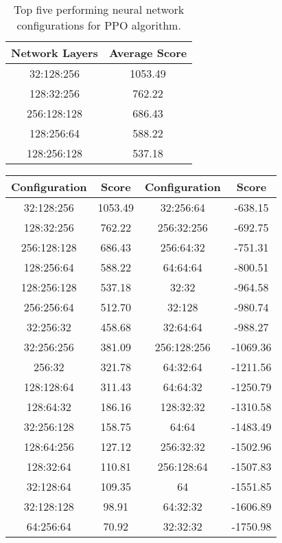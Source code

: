\begin{table}[h]
\centering
\begin{tabular}{|c|c|}
\hline
\textbf{Network Layers} & \textbf{Average Score} \\
\hline
\hline
32:128:256 & 1053.49 \\
\hline
128:32:256 & 762.22 \\
\hline
256:128:128 & 686.43 \\
\hline
128:256:64 & 588.22 \\
\hline
128:256:128 & 537.18 \\
\hline
\end{tabular}
\caption{Top five performing neural network configurations for PPO algorithm.}
\label{tab:ppo_top_nn_configurations}
\end{table}
    
\begin{table}[h]
\centering
\begin{tabular}{|c|c||c|c|}
\hline
Configuration & Score & Configuration & Score \\
\hline
32:128:256 & 1053.49 & 32:256:64 & -638.15 \\
\hline
128:32:256 & 762.22 & 256:32:256 & -692.75 \\
\hline
256:128:128 & 686.43 & 256:64:32 & -751.31 \\
\hline
128:256:64 & 588.22 & 64:64:64 & -800.51 \\
\hline
128:256:128 & 537.18 & 32:32 & -964.58 \\
\hline
256:256:64 & 512.70 & 32:128 & -980.74 \\
\hline
32:256:32 & 458.68 & 32:64:64 & -988.27 \\
\hline
32:256:256 & 381.09 & 256:128:256 & -1069.36 \\
\hline
256:32 & 321.78 & 64:32:64 & -1211.56 \\
\hline
128:128:64 & 311.43 & 64:64:32 & -1250.79 \\
\hline
128:64:32 & 186.16 & 128:32:32 & -1310.58 \\
\hline
32:256:128 & 158.75 & 64:64 & -1483.49 \\
\hline
128:64:256 & 127.12 & 256:32:32 & -1502.96 \\
\hline
128:32:64 & 110.81 & 256:128:64 & -1507.83 \\
\hline
32:128:64 & 109.35 & 64 & -1551.85 \\
\hline
32:128:128 & 98.91 & 64:32:32 & -1606.89 \\
\hline
64:256:64 & 70.92 & 32:32:32 & -1750.98 \\

\end{tabular}
\end{table}
